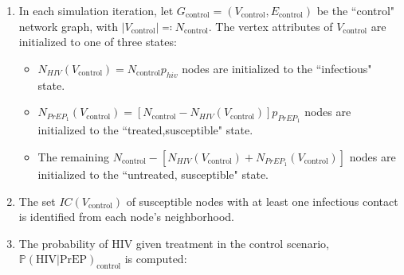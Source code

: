 \documentclass{article}
\theoremstyle{definition}
\begin{document}
    \begin{enumerate}
\item In each simulation iteration, let $G_{\text{control}}=\left(V_{\text{control}},E_{\text{control}}\right)$ be the ``control" network graph, with $\vert V_{\text{control}}\vert \eqqcolon N_{\text{control}}$. The vertex attributes of $V_{\text{control}}$ are initialized to one of three states: 
\begin{itemize}
        \item  $N_{HIV}(V_{\text{control}})=N_{\text{control}}p_{hiv}$ nodes are initialized to the  ``infectious" state.
        \item $N_{PrEP_{1}}\left(V_{\text{control}}\right)=\left[N_{\text{control}}-N_{HIV}\left(V_{\text{control}}\right)\right]p_{PrEP_{1}}$ nodes are initialized to the ``treated,susceptible" state. 
        \item The remaining $N_{\text{control}}-\left[N_{HIV}\left(V_{\text{control}}\right)+N_{PrEP_{1}}\left(V_{\text{control}}\right)\right]$ nodes are initialized to the ``untreated, susceptible" state.
    \end{itemize}
    \item The set $IC(V_{\text{control}})$ of susceptible nodes with at least one infectious contact is identified from each node's neighborhood.
    \item The probability of HIV given treatment in the control scenario, $\mathbb{P}(\text{HIV} \vert \text{PrEP})_{\text{control}}$ is computed:
    \begin{enumerate}
     

\end{enumerate}
\end{enumerate}
\end{document}
